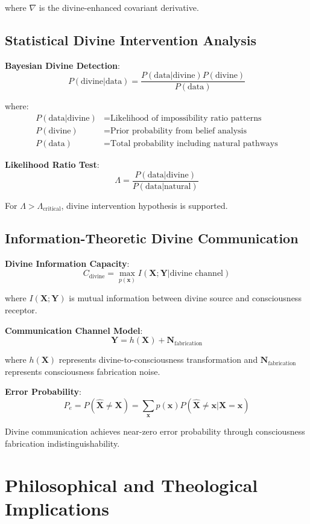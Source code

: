 \documentclass[12pt,a4paper]{article}
\begin{document}
where $\nabla$ is the divine-enhanced covariant derivative.

\subsection{Statistical Divine Intervention Analysis}

\textbf{Bayesian Divine Detection}:
$$P(\text{divine}|\text{data}) = \frac{P(\text{data}|\text{divine})P(\text{divine})}{P(\text{data})}$$

where:
\begin{align}
P(\text{data}|\text{divine}) &= \text{Likelihood of impossibility ratio patterns}\\
P(\text{divine}) &= \text{Prior probability from belief analysis}\\
P(\text{data}) &= \text{Total probability including natural pathways}
\end{align}

\textbf{Likelihood Ratio Test}:
$$\Lambda = \frac{P(\text{data}|\text{divine})}{P(\text{data}|\text{natural})}$$

For $\Lambda > \Lambda_{\text{critical}}$, divine intervention hypothesis is supported.

\subsection{Information-Theoretic Divine Communication}

\textbf{Divine Information Capacity}:
$$C_{\text{divine}} = \max_{p(\mathbf{x})} I(\mathbf{X}; \mathbf{Y}|\text{divine channel})$$

where $I(\mathbf{X}; \mathbf{Y})$ is mutual information between divine source and consciousness receptor.

\textbf{Communication Channel Model}:
$$\mathbf{Y} = h(\mathbf{X}) + \mathbf{N}_{\text{fabrication}}$$

where $h(\mathbf{X})$ represents divine-to-consciousness transformation and $\mathbf{N}_{\text{fabrication}}$ represents consciousness fabrication noise.

\textbf{Error Probability}:
$$P_e = P(\hat{\mathbf{X}} \neq \mathbf{X}) = \sum_{\mathbf{x}} p(\mathbf{x}) P(\hat{\mathbf{X}} \neq \mathbf{x}|\mathbf{X} = \mathbf{x})$$

Divine communication achieves near-zero error probability through consciousness fabrication indistinguishability.

\section{Philosophical and Theological Implications}
\end{document}
